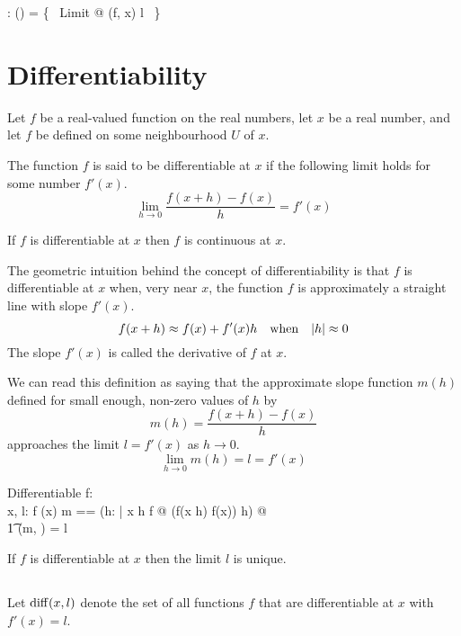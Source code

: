\documentclass[11pt, oneside]{article}
\begin{document}
\begin{axdef}
	\limFR: (\R \pfun \R) \cross \R \pfun \R
\where
	\limFR = \{~ Limit @ (f, x) \mapsto l ~\}
\end{axdef}

\section{Differentiability}

Let $f$ be a real-valued function on the real numbers, let $x$ be a real number,
and let $f$ be defined on some neighbourhood $U$ of $x$.

The function $f$ is said to be differentiable at $x$ if the following limit holds for some number $f'(x)$.
$$
\lim_{h \to 0} \frac{f(x+h) - f(x)}{h} = f'(x)
$$

\begin{remark}
If $f$ is differentiable at $x$ then $f$ is continuous at $x$.
\end{remark}

The geometric intuition behind the concept of differentiability is that $f$ is differentiable at $x$
when, very near $x$, the function $f$ is approximately a straight line with slope $f'(x)$.
$$
f(x + h) \approx f(x) + f'(x) h \quad \text{when} \quad \abs{h} \approx 0
$$
The slope $f'(x)$ is called the derivative of $f$ at $x$.

We can read this definition as saying that the approximate slope function $m(h)$ defined for 
small enough, non-zero values of $h$ by
$$
	m(h) = \frac{f(x + h) - f(x)}{h}
$$
approaches the limit $l = f'(x)$ as $h \to 0$.
$$
	\lim_{h\to 0}{m(h)} = l = f'(x)
$$

\begin{schema}{Differentiable}
	f: \R \pfun \R \\
	x, l: \R
\where
	f \in \CzeroR(x)
\also
	\LET m == (\lambda h: \Rnz | x \addR h \in \dom f @ (f(x \addR h) \subR f(x)) \divR h) @ \\
	\t1	\limFR(m, \zeroR) = l
\end{schema}

\begin{remark}
If $f$ is differentiable at $x$ then the limit $l$ is unique.
\end{remark}

\subsection{}

Let $\operatorname{diff}(x,l)$ denote the set of all functions $f$ that are differentiable at $x$ with $f'(x) = l$.
\end{document}
